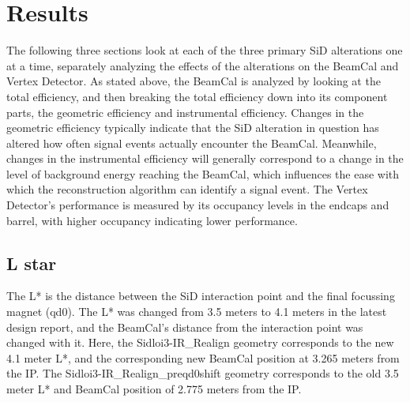 \documentclass{report}
\begin{document}
        \section{Results}
            The following three sections look at each of the three primary SiD alterations one at a time, separately analyzing the effects of the alterations on the BeamCal and Vertex Detector. As stated above, the BeamCal is analyzed by looking at the total efficiency, and then breaking the total efficiency down into its component parts, the geometric efficiency and instrumental efficiency. Changes in the geometric efficiency typically indicate that the SiD alteration in question has altered how often signal events actually encounter the BeamCal. Meanwhile, changes in the instrumental efficiency will generally correspond to a change in the level of background energy reaching the BeamCal, which influences the ease with which the reconstruction algorithm can identify a signal event. The Vertex Detector's performance is measured by its occupancy levels in the endcaps and barrel, with higher occupancy indicating lower performance.

            \subsection{L star} \label{sect__analysis_lstar}
                The L* is the distance between the SiD interaction point and the final focussing magnet (qd0). The L* was changed from 3.5 meters to 4.1 meters in the latest design report, and the BeamCal's distance from the interaction point was changed with it. Here, the Sidloi3-IR\_Realign geometry corresponds to the new 4.1 meter L*, and the corresponding new BeamCal position at 3.265 meters from the IP. The Sidloi3-IR\_Realign\_preqd0shift geometry corresponds to the old 3.5 meter L* and BeamCal position of 2.775 meters from the IP.
\end{document}
